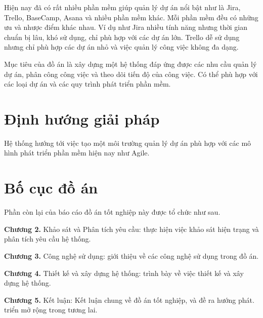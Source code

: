 \documentclass[../DoAn.tex]{subfiles}
\begin{document}
Hiện nay đã có rất nhiều phần mềm giúp quản lý dự án nổi bật như là Jira, Trello, BaseCamp, Asana và nhiều phần mềm khác. Mỗi phần mềm đều có những ưu và nhược điểm khác nhau.
Ví dụ như Jira nhiều tính năng nhưng thời gian chuẩn bị lâu, khó sử dụng, chỉ phù hợp với các dự án lớn. Trello dễ sử dụng nhưng chỉ phù hợp các dự án nhỏ và việc quản lý công việc không đa dạng.

Mục tiêu của đồ án là xây dựng một hệ thống đáp ứng được các nhu cầu quản lý dự án, phân công công việc và theo dõi tiến độ của công việc. Có thể phù hợp với các loại dự án và các quy trình phát triển phần mềm.

\section{Định hướng giải pháp}
\label{section:1.3}

Hệ thống hướng tới việc tạo một môi trường quản lý dự án phù hợp với các mô hình phát triển phần mềm hiện nay như Agile.

\section{Bố cục đồ án}
\label{section:1.4}

Phần còn lại của báo cáo đồ án tốt nghiệp này được tổ chức như sau.

\textbf{Chương 2.} Khảo sát và Phân tích yêu cầu: thực hiện việc khảo sát hiện trạng và phân tích yêu cầu hệ thống.

\textbf{Chương 3.} Công nghệ sử dụng: giới thiệu về các công nghệ sử dụng trong đồ án.

\textbf{Chương 4.} Thiết kế và xây dựng hệ thống: trình bày về việc thiết kế và xây dựng hệ thống.

\textbf{Chương 5.} Kết luận: Kết luận chung về đồ án tốt nghiệp, và đề ra hướng phát. triển mở rộng trong tương lai.
\end{document}
